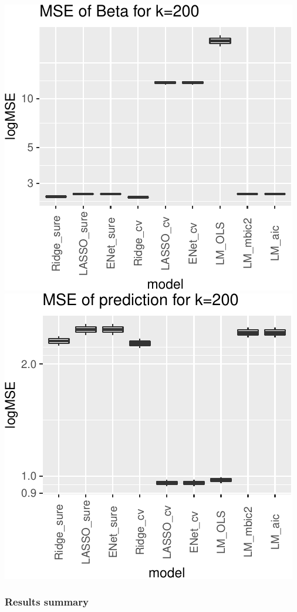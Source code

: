 \documentclass[
]{article}
\begin{document}
\includegraphics[width=0.8\linewidth]{report_files/figure-latex/unnamed-chunk-7-5}
\includegraphics[width=0.8\linewidth]{report_files/figure-latex/unnamed-chunk-7-6}

\hypertarget{results-summary-1}{%
\subsubsection{Results summary}\label{results-summary-1}}
\end{document}
